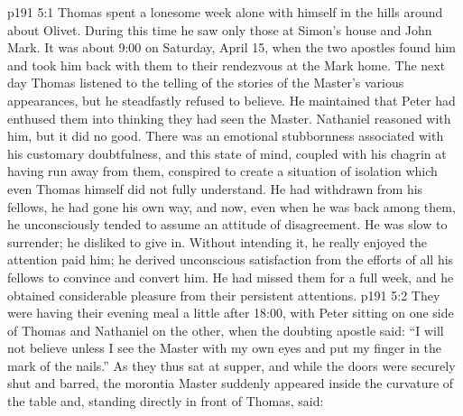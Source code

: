 \vs p191 5:1 Thomas spent a lonesome week alone with himself in the hills around about Olivet. During this time he saw only those at Simon’s house and John Mark. It was about 9:00 on Saturday, April 15, when the two apostles found him and took him back with them to their rendezvous at the Mark home. The next day Thomas listened to the telling of the stories of the Master’s various appearances, but he steadfastly refused to believe. He maintained that Peter had enthused them into thinking they had seen the Master. Nathaniel reasoned with him, but it did no good. There was an emotional stubbornness associated with his customary doubtfulness, and this state of mind, coupled with his chagrin at having run away from them, conspired to create a situation of isolation which even Thomas himself did not fully understand. He had withdrawn from his fellows, he had gone his own way, and now, even when he was back among them, he unconsciously tended to assume an attitude of disagreement. He was slow to surrender; he disliked to give in. Without intending it, he really enjoyed the attention paid him; he derived unconscious satisfaction from the efforts of all his fellows to convince and convert him. He had missed them for a full week, and he obtained considerable pleasure from their persistent attentions.
\vs p191 5:2 They were having their evening meal a little after 18:00, with Peter sitting on one side of Thomas and Nathaniel on the other, when the doubting apostle said: “I will not believe unless I see the Master with my own eyes and put my finger in the mark of the nails.” As they thus sat at supper, and while the doors were securely shut and barred, the morontia Master suddenly appeared inside the curvature of the table and, standing directly in front of Thomas, said:
